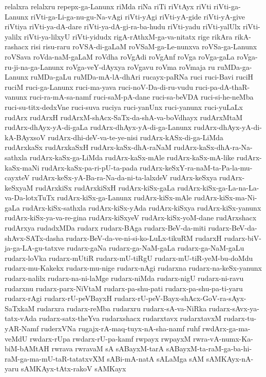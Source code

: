 {relalxra
relalxru
repepx-ga-Lanunx
riMda
riNa
riTi
riVtAyx
riVti
riVti-ga-Lanunx
riVti-ga-Li-ga-nu-gu-Na-vAgi
riVti-yAgi
riVti-yA-gide
riVti-yA-give
riVtiya
riVti-ya-dA-dare
riVti-ya-dA-gi-ra-ba-hudu
riVti-yadu
riVti-yalUlx
riVti-yalilx
riVti-ya-lilxyU
riVti-yidudx
rigA-rAthxM-ga-va-nitatx
rige
rikAra
rikA-rashacx
risi
risu-raru
roVSA-di-gaLaM
roVSaM-ga-Le-nunxva
roVSa-ga-Lanunx
roVSava
roVda-naM-gaLaM
roVdha
roVgAdi
roVgAnf
roVga
roVga-gaLa
roVga-ru-ji-na-ga-Lanunx
roVga-veY-dAyxya
roVgavu
roVma
roVmaja
ru
ruMDa-ga-Lanunx
ruMDa-gaLu
ruMDa-mA-lA-dhAri
rucayx-paRNa
ruci
ruci-Bavi
ruciH
ruciM
ruci-ga-Lanunx
ruci-ma-yava
ruci-noV-Da-di-ru-vudu
ruci-pa-dA-thaR-vanunx
ruci-ra-mA-sa-namf
ruci-saM-pA-dane
ruci-sa-beVDA
ruci-si-he-neMba
ruci-su-titx-dedxVne
ruci-suva
ruciya
ruci-yanUnx
ruci-yanunx
ruci-yuLaLx
rudArx
rudArxH
rudArxM-shAcx-SaTx-da-shA-va-boVdhayx
rudArxMtaM
rudArx-dhAyx-yA-di-gaLa
rudArx-dhAyx-yA-di-ga-Lanunx
rudArx-dhAyx-yA-di-kA-BAyxsoV
rudArx-dhi-deV-va-te-ye-nisi
rudArx-kASx-di-ga-LiMda
rudArxkaSx
rudArxkaSxH
rudArx-kaSx-dhA-raNaM
rudArx-kaSx-dhA-ra-Na-sathxla
rudArx-kaSx-ga-LiMda
rudArx-kaSx-mAle
rudArx-kaSx-mA-like
rudArx-kaSx-maNi
rudArx-kaSx-pa-ri-pU-ta-pada
rudArx-keSxY-ra-naM-ta-Pa-la-mu-cayxteV
rudArx-keSx-yA-Ba-ra-Na-da-ni-ta-lalxdeV
rudArx-keSxya
rudArx-keSxyaM
rudArxkiSx
rudArxkiSxH
rudArx-kiSx-gaLa
rudArx-kiSx-ga-La-na-La-va-Da-lotxTuTx
rudArx-kiSx-ga-Lanunx
rudArx-kiSx-mAle
rudArx-kiSx-ma-Ni-gaLa
rudArx-kiSx-sathxla
rudArx-kiSx-yAda
rudArx-kiSxya
rudArx-kiSx-yanunx
rudArx-kiSx-ya-va-re-gina
rudArx-kiSxyeV
rudArx-kiSx-yoM-dane
rudArxshacx
rudArxya
rudadxMDa
rudarx
rudarx-BAga
rudarx-BeV-da-miti
rudarx-BeV-da-shAvx-SATx-dasha
rudarx-BeV-da-ve-ni-si-ko-LuLx-tikuRM
rudarxH
rudarx-biV-ja-ga-LA-gu-tatxve
rudarx-gaNa
rudarx-ga-NaM-gaLa
rudarx-ga-NaM-gaLu
rudarx-loVka
rudarx-mUtiR
rudarx-mU-tiRgU
rudarx-mU-tiR-yeM-bu-doMdu
rudarx-mu-Kakekx
rudarx-mu-nige
rudarx-nAgi
rudarxna
rudarx-na-keSx-yanunx
rudarx-nalilx
rudarx-na-ni-laMge
rudarx-niMda
rudarx-nigU
rudarx-ni-ravu
rudarxnu
rudarx-parx-NiVtaM
rudarx-pa-shu-pati
rudarx-pa-shu-pa-ti-yaru
rudarx-rAgi
rudarx-rU-peVBayxH
rudarx-rU-peV-Bayx-shAcx-GoV-ra-sAyx-SaTxkaM
rudarxra
rudarx-reMba
rudarxru
rudarx-sA-va-NiRka
rudarx-sAvx-ya-tatx-vAda
rudarx-satx-theYva
rudarxshacx
rudarxtavx
rudarxtavxM
rudarx-tu-yAR-Namf
ruderxVNa
rugajx-rA-maq-tuyx-nA-sha-namf
ruhf
rwdArx-ga-ma-veMdU
rwdarx-rUpa
rwdarx-rU-pa-kamf
rwpayx
rwpayxM
rwra-vA-numx-Ka-biM-bAMtAH
rwrava
rwravaM
sA
sABayxM-tarA
sABayxM-ta-raM-ga-ba-hi-raM-ga-ma-mU-taR-tatatxvXM
sABi-mA-natA
sALaMga
sAM
sAMKAyx-nA-yaru
sAMKAyx-tAtx-rakoV
sAMKayx
}
